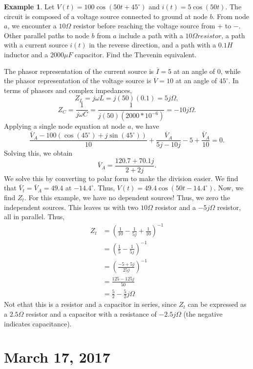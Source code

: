\documentclass[11pt]{article}
\theoremstyle{plain} %
\theoremstyle{definition}
\theoremstyle{example}
\newtheorem*{example}{Example}
\theoremstyle{remark}
\newcommand{\degree}{^{\circ}}
\begin{document}
\begin{example}
Let $V(t) = 100\cos\left(50t+45\degree\right)$ and $i(t) = 5\cos(50t)$. The circuit is composed of a voltage source connected to ground at node $b$. From node $a$, we encounter a $10\Omega$ resistor before reaching the voltage source from $+$ to $-$. Other parallel paths to node $b$ from $a$ include a path with a $10\Omega resistor$, a path with a current source $i(t)$ in the reverse direction, and a path with a $0.1H$ inductor and a $2000\mu F$ capacitor. Find the Thevenin equivalent. 
\end{example}
The phasor representation of the current source is $\overline I  = 5$ at an angle of 0, while the phasor representation of the voltage source  is $\overline V = 10$ at an angle of $45\degree$. In terms of phasors and complex impedances, 
$$Z_L = j\omega L = j (50)(0.1) = 5j\Omega,$$
$$Z_C = \frac{1}{j\omega C} = \frac{1}{j(50)\left(2000*10^{-6}\right)} = -10j\Omega.$$
Applying a single node equation at node $a$, we have 
$$\frac{\overline V_A - 100\left(\cos\left(45\degree\right) + j\sin\left(45\degree\right)\right)}{10} + \frac{\overline V_A}{5j-10j}-5 + \frac{\overline V_A}{10} = 0.$$
Solving this, we obtain $$\overline V_A = \frac{120.7 + 70.1j}{2+2j}.$$ We solve this by converting to polar form to make the division easier. We find that $\overline V_t = \overline V_A = 49.4$ at $-14.4\degree$. Thus, $V(t) = 49.4 \cos\left(50t-14.4\degree\right).$
Now, we find $Z_t$. For this example, we have no dependent sources! Thus, we zero the independent sources. This leaves us with two $10\Omega$ resistor and a $-5j\Omega$ resistor, all in parallel. Thus, 
\begin{align*}
	Z_t &= \left(\frac{1}{10} -\frac{1}{5j}+\frac{1}{10}\right)^{-1}\\
	&= \left(\frac{1}{5} -\frac{1}{5j}\right)^{-1}\\
	&= \left(\frac{-5+5j}{25j}\right)^{-1}\\
	&= \frac{125-125j}{50}\\
	&= \frac{5}{2}-\frac{5}{2}j \Omega
\end{align*}
Not ethat this is a resistor and a capacitor in series, since $Z_t$ can be expressed as a $2.5\Omega$ resistor and a capacitor with a resistance of $-2.5j\Omega$ (the negative indicates capacitance). 

\section{March 17, 2017}
\end{document}
